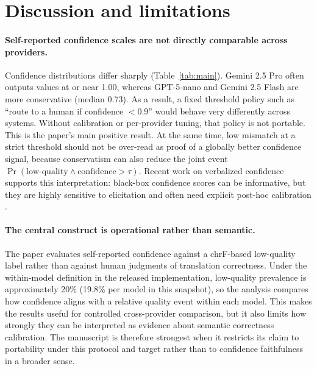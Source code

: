 \documentclass[10pt,conference]{IEEEtran}
\begin{document}
\section{Discussion and limitations}

\paragraph{Self-reported confidence scales are not directly comparable across providers.}
Confidence distributions differ sharply (Table~\ref{tab:main}). Gemini 2.5 Pro often outputs values at or near 1.00, whereas GPT-5-nano and Gemini 2.5 Flash are more conservative (median 0.73). As a result, a fixed threshold policy such as ``route to a human if confidence $< 0.9$'' would behave very differently across systems. Without calibration or per-provider tuning, that policy is not portable. This is the paper's main positive result. At the same time, low mismatch at a strict threshold should not be over-read as proof of a globally better confidence signal, because conservatism can also reduce the joint event $\Pr(\mathrm{low\mbox{-}quality} \wedge \mathrm{confidence}>\tau)$. Recent work on verbalized confidence supports this interpretation: black-box confidence scores can be informative, but they are highly sensitive to elicitation and often need explicit post-hoc calibration \citep{ulmer-etal-2024-calibrating}.

\paragraph{The central construct is operational rather than semantic.}
The paper evaluates self-reported confidence against a chrF-based low-quality label rather than against human judgments of translation correctness. Under the within-model definition in the released implementation, low-quality prevalence is approximately 20\% (19.8\% per model in this snapshot), so the analysis compares how confidence aligns with a relative quality event within each model. This makes the results useful for controlled cross-provider comparison, but it also limits how strongly they can be interpreted as evidence about semantic correctness calibration. The manuscript is therefore strongest when it restricts its claim to portability under this protocol and target rather than to confidence faithfulness in a broader sense.
\end{document}
